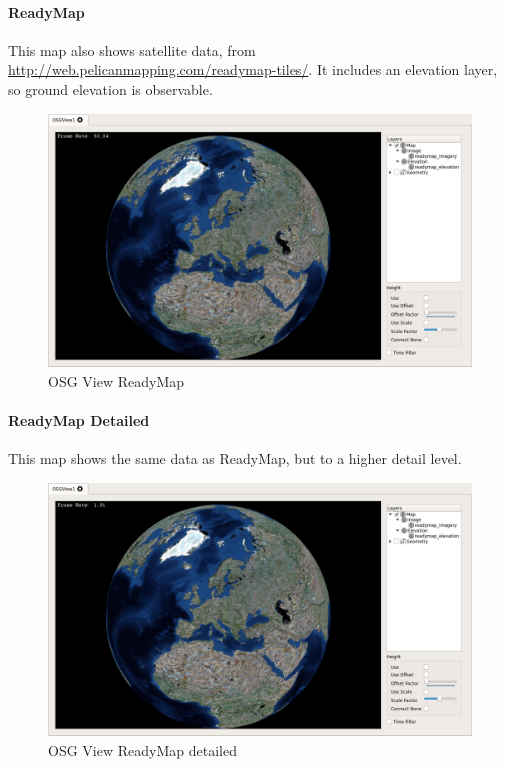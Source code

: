 \documentclass[10pt,letterpaper,extrafontsizes]{memoir}
\begin{document}
{\newpage
\paragraph{ReadyMap}

This map also shows satellite data, from \url{http://web.pelicanmapping.com/readymap-tiles/}. It includes an elevation layer, so ground elevation is observable.

\begin{figure}[H]
    \hspace*{-2cm}
    \includegraphics[width=18cm,frame]{../screenshots/osgview_ready.png}
  \caption{OSG View ReadyMap}
\end{figure}


\paragraph{ReadyMap Detailed}

This map shows the same data as ReadyMap, but to a higher detail level.

\begin{figure}[H]
    \hspace*{-2cm}
    \includegraphics[width=18cm,frame]{../screenshots/osgview_ready_detail.png}
  \caption{OSG View ReadyMap detailed}
\end{figure}


}
\end{document}
